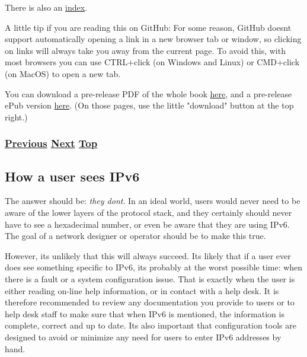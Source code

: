 \documentclass[
]{article}
\begin{document}
There is also an \hyperref[book6-main-index]{index}.

A little tip if you are reading this on GitHub: For some reason, GitHub
doesn\textquotesingle t support automatically opening a link in a new
browser tab or window, so clicking on links will always take you away
from the current page. To avoid this, with most browsers you can use
CTRL+click (on Windows and Linux) or CMD+click (on MacOS) to open a new
tab.

You can download a pre-release PDF of the whole book
\href{https://github.com/becarpenter/book6/blob/main/pdf/baked.pdf}{here},
and a pre-release ePub version
\href{https://github.com/becarpenter/book6/blob/main/pdf/baked.epub}{here}.
(On those pages, use the little "download" button at the top right.)

\subsubsection{\texorpdfstring{\hyperref[foreword]{Previous}
\hyperref[how-a-user-sees-ipv6]{Next}
\hyperref[introduction-and-foreword]{Top}}{Previous Next Top}}\label{previous-next-top}

\pagebreak

\subsection{How a user sees IPv6}\label{how-a-user-sees-ipv6}

The answer should be: \emph{they don\textquotesingle t}. In an ideal
world, users would never need to be aware of the lower layers of the
protocol stack, and they certainly should never have to see a
hexadecimal number, or even be aware that they are using IPv6. The goal
of a network designer or operator should be to make this true.

However, it\textquotesingle s unlikely that this will always succeed.
It\textquotesingle s likely that if a user ever does see something
specific to IPv6, it\textquotesingle s probably at the worst possible
time: when there is a fault or a system configuration issue. That is
exactly when the user is either reading on-line help information, or in
contact with a help desk. It is therefore recommended to review any
documentation you provide to users or to help desk staff to make sure
that when IPv6 is mentioned, the information is complete, correct and up
to date. It\textquotesingle s also important that configuration tools
are designed to avoid or minimize any need for users to enter IPv6
addresses by hand.
\end{document}
